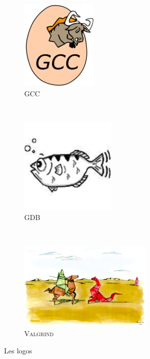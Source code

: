 \begin{figure}
        \centering
        \begin{subfigure}[b]{0.3\textwidth}
                \centering
    			\includegraphics[width=0.4\textwidth]{./images/gcc.png}
                \caption{\textsc{GCC}}
                \label{logo-gcc}
        \end{subfigure}%
        ~
        \begin{subfigure}[b]{0.3\textwidth}
                \centering
                \includegraphics[width=0.5\textwidth]{./images/gdb.png}
                \caption{\textsc{GDB}}
                \label{logo-gdb}
        \end{subfigure}%
        ~
        \begin{subfigure}[b]{0.3\textwidth}
                \centering
                \includegraphics[width=0.7\textwidth]{./images/Valgrind_logo.png}
                \caption{\textsc{Valgrind}}
                \label{logo-valgrind}
        \end{subfigure}
        \caption{Les logos}\label{logos}
\end{figure}


